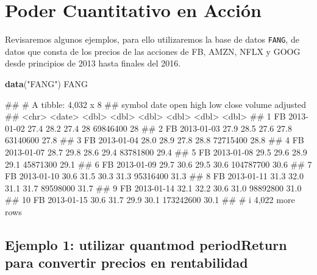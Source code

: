 \documentclass[
]{book}
\newenvironment{Shaded}{\begin{snugshade}}{\end{snugshade}}
\newcommand{\FunctionTok}[1]{\textcolor[rgb]{0.13,0.29,0.53}{\textbf{#1}}}
\newcommand{\NormalTok}[1]{#1}
\newcommand{\StringTok}[1]{\textcolor[rgb]{0.31,0.60,0.02}{#1}}
\begin{document}
\hypertarget{poder-cuantitativo-en-acciuxf3n}{%
\section{Poder Cuantitativo en Acción}\label{poder-cuantitativo-en-acciuxf3n}}

Revisaremos algunos ejemplos, para ello utilizaremos la base de datos \texttt{FANG}, de datos que consta de los precios de las acciones de FB, AMZN, NFLX y GOOG desde principios de 2013 hasta finales del 2016.

\begin{Shaded}
\begin{Highlighting}[]
\FunctionTok{data}\NormalTok{(}\StringTok{"FANG"}\NormalTok{)}
\NormalTok{FANG}
\end{Highlighting}
\end{Shaded}

\begin{Shaded}
\begin{Highlighting}[]
\NormalTok{\#\# \# A tibble: 4,032 x 8}
\NormalTok{\#\#    symbol date        open  high   low close    volume adjusted}
\NormalTok{\#\#    \textless{}chr\textgreater{}  \textless{}date\textgreater{}     \textless{}dbl\textgreater{} \textless{}dbl\textgreater{} \textless{}dbl\textgreater{} \textless{}dbl\textgreater{}     \textless{}dbl\textgreater{}    \textless{}dbl\textgreater{}}
\NormalTok{\#\#  1 FB     2013{-}01{-}02  27.4  28.2  27.4  28    69846400     28  }
\NormalTok{\#\#  2 FB     2013{-}01{-}03  27.9  28.5  27.6  27.8  63140600     27.8}
\NormalTok{\#\#  3 FB     2013{-}01{-}04  28.0  28.9  27.8  28.8  72715400     28.8}
\NormalTok{\#\#  4 FB     2013{-}01{-}07  28.7  29.8  28.6  29.4  83781800     29.4}
\NormalTok{\#\#  5 FB     2013{-}01{-}08  29.5  29.6  28.9  29.1  45871300     29.1}
\NormalTok{\#\#  6 FB     2013{-}01{-}09  29.7  30.6  29.5  30.6 104787700     30.6}
\NormalTok{\#\#  7 FB     2013{-}01{-}10  30.6  31.5  30.3  31.3  95316400     31.3}
\NormalTok{\#\#  8 FB     2013{-}01{-}11  31.3  32.0  31.1  31.7  89598000     31.7}
\NormalTok{\#\#  9 FB     2013{-}01{-}14  32.1  32.2  30.6  31.0  98892800     31.0}
\NormalTok{\#\# 10 FB     2013{-}01{-}15  30.6  31.7  29.9  30.1 173242600     30.1}
\NormalTok{\#\# \# i 4,022 more rows}
\end{Highlighting}
\end{Shaded}

\hypertarget{ejemplo-1-utilizar-quantmod-periodreturn-para-convertir-precios-en-rentabilidad}{%
\subsection{Ejemplo 1: utilizar quantmod periodReturn para convertir precios en rentabilidad}\label{ejemplo-1-utilizar-quantmod-periodreturn-para-convertir-precios-en-rentabilidad}}
\end{document}
